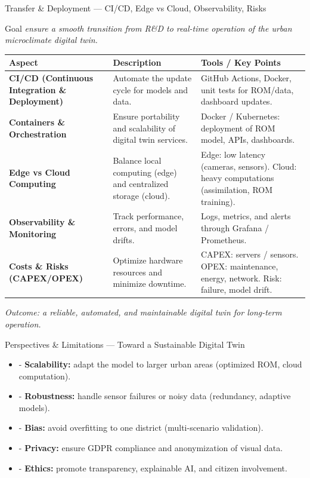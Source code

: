 \documentclass{beamer}
\begin{document}
\begin{frame}{Transfer \& Deployment — CI/CD, Edge vs Cloud, Observability, Risks}
\centering
\tiny
\begin{block}{Goal}
    \textit{ensure a smooth transition from R\&D to real-time operation of the urban microclimate digital twin.}
\end{block}
\vspace{0.4cm}
\begin{tabular}{|p{2.5cm}|p{3.5cm}|p{4.2cm}|}
\hline
\textbf{Aspect} & \textbf{Description} & \textbf{Tools / Key Points} \\
\hline
\textbf{CI/CD (Continuous Integration \& Deployment)} &
Automate the update cycle for models and data. &
GitHub Actions, Docker, unit tests for ROM/data, dashboard updates. \\
\hline
\textbf{Containers \& Orchestration} &
Ensure portability and scalability of digital twin services. &
Docker / Kubernetes: deployment of ROM model, APIs, dashboards. \\
\hline
\textbf{Edge vs Cloud Computing} &
Balance local computing (edge) and centralized storage (cloud). &
Edge: low latency (cameras, sensors).  
Cloud: heavy computations (assimilation, ROM training). \\
\hline
\textbf{Observability \& Monitoring} &
Track performance, errors, and model drifts. &
Logs, metrics, and alerts through Grafana / Prometheus. \\
\hline
\textbf{Costs \& Risks (CAPEX/OPEX)} &
Optimize hardware resources and minimize downtime. &
CAPEX: servers / sensors.  
OPEX: maintenance, energy, network.  
Risk: failure, model drift. \\
\hline
\end{tabular}

\vspace{0.3cm}
\textit{Outcome: a reliable, automated, and maintainable digital twin for long-term operation.}
\end{frame}


\begin{frame}{Perspectives \& Limitations — Toward a Sustainable Digital Twin}

\vspace{3mm}
\begin{itemize}
    \item - \textbf{Scalability:} adapt the model to larger urban areas (optimized ROM, cloud computation).  
    \item - \textbf{Robustness:} handle sensor failures or noisy data (redundancy, adaptive models).  
    \item - \textbf{Bias:} avoid overfitting to one district (multi-scenario validation).  
    \item - \textbf{Privacy:} ensure GDPR compliance and anonymization of visual data.  
    \item - \textbf{Ethics:} promote transparency, explainable AI, and citizen involvement.  
\end{itemize}

\end{frame}
\end{document}
